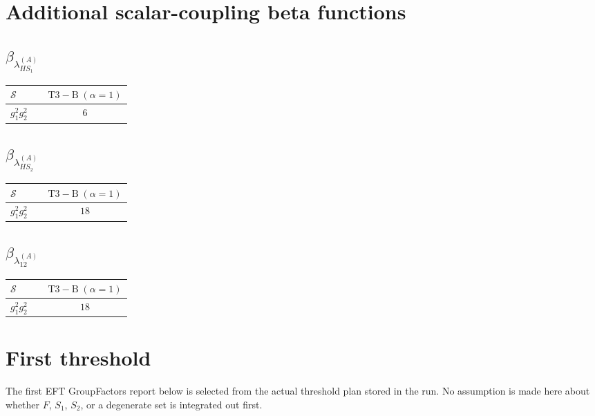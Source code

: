 \documentclass[9pt]{article}
\begin{document}
\section*{Additional scalar-coupling beta functions}
\subsection*{$ \beta_{\lambda_{HS_1}^{(A)}} $}
\begin{longtable}{@{}p{0.31\linewidth}c@{}}
\toprule
$\mathcal{S}$ & $ \mathrm{T3-B}\;(\alpha=1) $ \\
\midrule
$ g_1^2g_2^2 $ & $ 6 $ \\
\bottomrule
\end{longtable}
\subsection*{$ \beta_{\lambda_{HS_2}^{(A)}} $}
\begin{longtable}{@{}p{0.31\linewidth}c@{}}
\toprule
$\mathcal{S}$ & $ \mathrm{T3-B}\;(\alpha=1) $ \\
\midrule
$ g_1^2g_2^2 $ & $ 18 $ \\
\bottomrule
\end{longtable}
\subsection*{$ \beta_{\lambda_{12}^{(A)}} $}
\begin{longtable}{@{}p{0.31\linewidth}c@{}}
\toprule
$\mathcal{S}$ & $ \mathrm{T3-B}\;(\alpha=1) $ \\
\midrule
$ g_1^2g_2^2 $ & $ 18 $ \\
\bottomrule
\end{longtable}
\section*{First threshold}
The first EFT GroupFactors report below is selected from the actual threshold plan stored in the run.  No assumption is made here about whether $F$, $S_1$, $S_2$, or a degenerate set is integrated out first.
\end{document}
